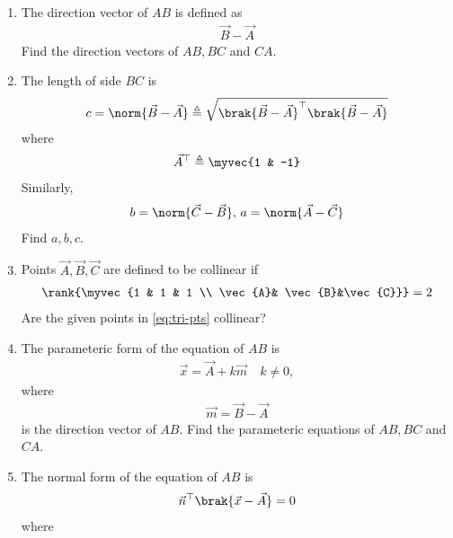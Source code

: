 \begin{enumerate}[label=\thesubsection.\arabic*.,ref=\thesubsection.\theenumi]
\item The direction vector of $AB$ is defined as
		\begin{align}
			\vec{B}-
			\vec{A}
		\end{align}
Find the direction vectors of $AB, BC$ and $CA$.
\\
	
	\item The length of side $BC$ is 
		\label{prob:side-length}
		\begin{align}
			c = \norm{\vec{B}-\vec{A}} \triangleq \sqrt{\brak{\vec{B}-\vec{A}}^{\top}\brak{\vec{B}-\vec{A}}}
		\end{align}
		where
		\begin{align}
			\vec{A}^{\top}\triangleq\myvec{1 & -1}
		\end{align}
		Similarly, 
		\begin{align}
b = \norm{\vec{C}-\vec{B}},\,
a = \norm{\vec{A}-\vec{C}}
		\end{align}
		Find $a, b, c$.
  \\            
\item   Points $\vec{A}, \vec{B}, \vec{C}$ are defined to be collinear if 
		\begin{align}
			\label{eq:line-rank}
			\rank{\myvec{1 & 1 & 1 \\ \vec{A}& \vec{B}&\vec{C}}} = 2
		\end{align}
Are the given points in
			\eqref{eq:tri-pts}
collinear?
 \\		
\item The parameteric form of the equation  of $AB$ is 
		\begin{align}
			\label{eq:geo-param}
			\vec{x}=\vec{A}+k\vec{m} \quad k \ne 0,
		\end{align}
		where
		\begin{align}
\vec{m}=\vec{B}-\vec{A}
		\end{align}
is the direction vector of $AB$.
Find the parameteric equations of $AB, BC$ and $CA$.
\\
		
\item The normal form of the equation of $AB$  is 
		\begin{align}
			\label{eq:geo-normal}
			\vec{n}^{\top}\brak{	\vec{x}-\vec{A}} = 0
		\end{align}
		where 

\end{enumerate}
